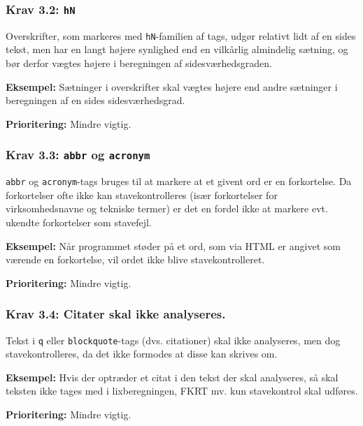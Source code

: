 \documentclass[a4paper,oneside,article, titlepage]{article}
\begin{document}
\subsubsection{Krav 3.2: \texttt{hN}}

Overskrifter, som markeres med \texttt{hN}-familien af tags, udgør
relativt lidt af en sides tekst, men har en langt højere synlighed end
en vilkårlig almindelig sætning, og bør derfor vægtes højere i
beregningen af sidesværhedsgraden.

\begin{description}
\item \textbf{Eksempel:} Sætninger i overskrifter skal vægtes højere
  end andre sætninger i beregningen af en sides sidesværhedsgrad.
\item \textbf{Prioritering:} Mindre vigtig.
\end{description}

\subsubsection{Krav 3.3: \texttt{abbr} og \texttt{acronym}}
\texttt{abbr} og \texttt{acronym}-tags bruges til at markere at et
givent ord er en forkortelse. Da forkortelser ofte ikke kan
stavekontrolleres (især forkortelser for virksomhedsnavne og tekniske
termer) er det en fordel ikke at markere evt. ukendte forkortelser som
stavefejl.

\begin{description}
\item \textbf{Eksempel:} Når programmet støder på et ord, som via HTML
  er angivet som værende en forkortelse, vil ordet ikke blive
  stavekontrolleret.
\item \textbf{Prioritering:} Mindre vigtig.
\end{description}

\subsubsection{Krav 3.4: Citater skal ikke analyseres.}
Tekst i \texttt{q} eller \texttt{blockquote}-tags
  (dvs. citationer) skal ikke analyseres, men dog stavekontrolleres,
  da det ikke formodes at disse kan skrives om.

\begin{description}
\item \textbf{Eksempel:} Hvis der optræder et citat i den tekst der
  skal analyseres, så skal teksten ikke tages med i lixberegningen,
  FKRT mv. kun stavekontrol skal udføres.
\item \textbf{Prioritering:} Mindre vigtig.
\end{description}
\end{document}
